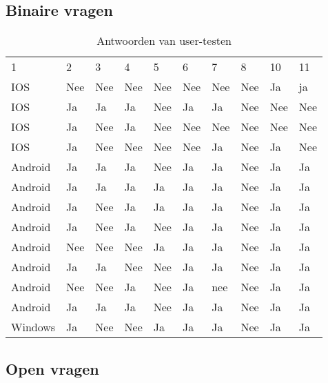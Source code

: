 \subsection{Binaire vragen}
	\begin{table}[H]
		\centering
		\begin{tabular}{llllllllll}
			1 &  2 & 3 & 4 & 5 & 6 & 7 & 8 & 10 &11\\
			IOS & Nee & Nee & Nee & Nee & Nee & Nee & Nee & Ja & ja \\
			IOS & Ja & Ja & Ja & Nee & Ja & Ja & Nee & Nee & Nee \\
			IOS & Ja & Nee & Ja & Nee & Nee & Nee & Nee & Nee & Nee \\
			IOS & Ja & Nee & Nee & Nee & Nee & Ja & Nee & Ja & Nee \\
			Android & Ja & Ja & Ja & Nee & Ja & Ja & Nee & Ja & Ja \\
			Android & Ja & Ja & Ja & Ja & Ja & Ja & Nee & Ja & Ja \\
			Android & Ja & Nee & Ja & Ja & Ja & Ja & Nee & Ja & Ja \\
			Android & Ja & Nee & Ja & Nee & Ja & Ja & Nee & Ja & Ja \\
			Android & Nee & Nee & Nee & Ja & Ja & Ja & Nee & Ja & Ja \\
			Android & Ja & Ja & Nee & Nee & Ja & Ja & Nee & Ja & Ja \\
			Android & Nee & Nee & Ja & Nee & Ja & nee & Nee & Ja & Ja \\
			Android & Ja & Ja & Ja & Nee & Ja & Ja & Nee & Ja & Ja \\
			Windows & Ja & Nee & Nee & Ja & Ja & Ja & Nee & Ja & Ja \\
		\end{tabular}	
		\caption{Antwoorden van user-testen}
	\end{table}
	
\subsection{Open vragen}
